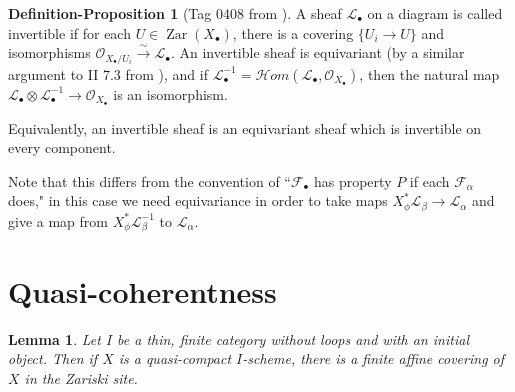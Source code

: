 \documentclass{report}
\newtheorem{lemma}[theorem]{Lemma}
\theoremstyle{definition}
\newtheorem{defprop}[theorem]{Definition-Proposition}
\newcommand{\cHom}{\mathcal{H} \textit{om}}
\DeclareMathOperator{\Zar}{Zar}
\newcommand{\FF}{\mathscr{F}}
\newcommand{\LL}{\mathcal{L}}
\newcommand{\OO}{\mathcal{O}}
\begin{document}
\begin{defprop}[Tag 0408 from \cite{stacks}]
	A sheaf $\LL_\bullet$ on a diagram is called invertible if for each $U \in \Zar(X_\bullet)$, there is a covering $\{U_i \rightarrow U\}$ and isomorphisms $\OO_{X_\bullet/U_i} \xrightarrow{\sim} \LL_\bullet$.
	An invertible sheaf is equivariant (by a similar argument to II 7.3 from \cite{Lipman2009}), and if $\LL_\bullet^{-1} = \cHom(\LL_\bullet, \OO_{X_\bullet})$, then the natural map $\LL_\bullet \otimes \LL_\bullet^{-1} \rightarrow \OO_{X_\bullet}$ is an isomorphism.
	
	Equivalently, an invertible sheaf is an equivariant sheaf which is invertible on every component.
\end{defprop}

Note that this differs from the convention of ``$\FF_\bullet$ has property $P$ if each $\FF_\alpha$ does," in this case we need equivariance in order to take maps $X_\phi^* \LL_\beta \rightarrow \LL_\alpha$ and give a map from $X_\phi^* \LL_\beta^{-1}$ to $\LL_\alpha$.

\section{Quasi-coherentness}
	
\begin{lemma}
	\label{lem:affinecover}
	Let $I$ be a thin, finite category without loops and with an initial object.
	Then if $X$ is a quasi-compact $I$-scheme, there is a finite affine covering of $X$ in the Zariski site.
\end{lemma}
\end{document}
